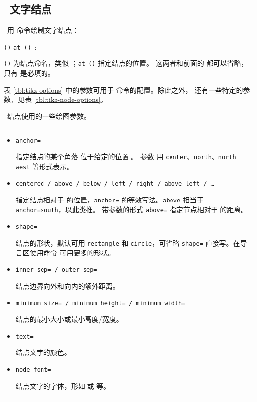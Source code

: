 \subsection{\TikZ\ 文字结点}\label{subsec:tikz-node}

\TikZ\ 用  命令绘制文字结点：
\begin{command}
 \texttt{()} \texttt{at ()} \texttt{;}
\end{command}
\texttt{()} 为结点命名，类似 ；\texttt{at ()} 指定结点的位置。
这两者和前面的  都可以省略，只有  是必填的。
\begin{example}
\end{example}

表 \ref{tbl:tikz-options} 中的参数可用于  命令的配置。除此之外， 还有一些特定的参数，见表 \ref{tbl:tikz-node-options}。

\begin{table}[htp]
\caption{\TikZ\ 结点使用的一些绘图参数。}\label{tbl:tikz-node-options}
\small
\hrule
\begin{itemize}
  \item \texttt{anchor=} \par
  指定结点的某个角落  位于给定的位置 。
  参数  用 \texttt{center}、\texttt{north}、\texttt{north west} 等形式表示。
  \item \texttt{centered / above / below / left / right / above left / \ldots} \par
  指定结点相对于  的位置，\texttt{anchor=} 的等效写法。\texttt{above} 相当于 \texttt{anchor=south}，以此类推。
  带参数的形式 \texttt{above=} 指定节点相对于  的距离。
  \item \texttt{shape=} \par
  结点的形状，默认可用 \texttt{rectangle} 和 \texttt{circle}，可省略 \texttt{shape=} 直接写。在导言区使用命令 
   可用更多的形状。
  \item \texttt{inner sep= / outer sep=} \par
  结点边界向外和向内的额外距离。
  \item \texttt{minimum size= / minimum height= / minimum width=} \par
  结点的最小大小或最小高度/宽度。
  \item \texttt{text=} \par
  结点文字的颜色。
  \item \texttt{node font=} \par
  结点文字的字体，形如  或  等。
\end{itemize}
\hrule
\end{table}

